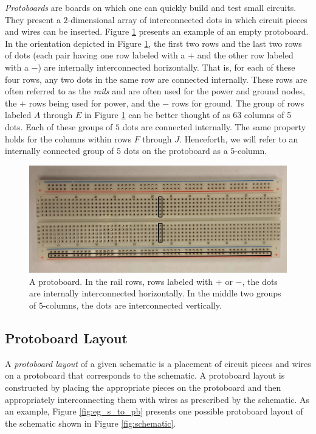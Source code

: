 \textit{Protoboards} are boards on which one can quickly build and test
small circuits. They present a $2$-dimensional array of interconnected dots
in which circuit pieces and wires can be inserted. Figure
\ref{fig:physical_protoboard} presents an example of an empty
protoboard.
In the orientation depicted in Figure \ref{fig:physical_protoboard}, the first
two rows and the last two rows of dots (each pair having one row labeled with a
$+$ and the other row labeled with a $-$) are internally interconnected
horizontally. That
is, for each of these four rows, any two dots in the same row are connected
internally.
These rows are often referred to as the \emph{rails} and are often used for the
power and ground nodes, the $+$ rows being used for power, and the $-$ rows for
ground.
The group of rows labeled $A$ through $E$ in Figure \ref{fig:physical_protoboard}
can be better thought of as $63$ columns of 5 dots. Each of these groups of $5$
dots are connected internally. The same property holds for the columns within
rows $F$ through $J$. Henceforth, we will refer to an internally connected
group of $5$ dots on the protoboard as a $5$-column.

\begin{figure}
\begin{center}
\includegraphics[width=\textwidth]{Images/physical_protoboard.jpg}
\caption[Protoboard]{A protoboard. In the rail rows, rows labeled with $+$ or
$-$, the dots are internally interconnected horizontally. In the middle two
groups of $5$-columns, the dots are interconnected vertically.}
\label{fig:physical_protoboard}
\end{center}
\end{figure}

\subsection{Protoboard Layout}

A \textit{protoboard layout} of a given schematic is a placement of
circuit pieces
and wires on a protoboard that corresponds to the schematic. A protoboard layout
is constructed by
placing the appropriate pieces on the protoboard and then appropriately
interconnecting them with wires as prescribed by the schematic. As an example,
Figure \ref{fig:eg_s_to_pb} presents one possible protoboard layout
of the schematic shown in Figure \ref{fig:schematic}.

